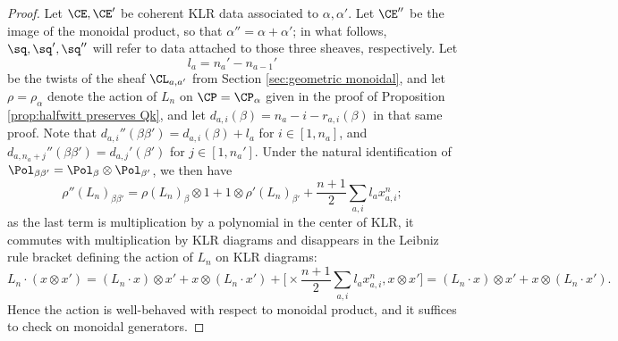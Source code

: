 \documentclass[11pt,reqno]{amsart}
\begin{document}
\begin{proof}
    Let $\CE,\CE'$ be coherent KLR data associated to $\alpha,\alpha'$. Let $\CE''$ be the image of the monoidal product, so that $\alpha''=\alpha+\alpha'$; in what follows, $\sq,\sq',\sq''$ will refer to data attached to those three sheaves, respectively. Let
    \[l_a=n_a'-n_{a-1}'\]
    be the twists of the sheaf $\CL_{a,a'}$ from Section \ref{sec:geometric monoidal}, and let $\rho=\rho_\alpha$ denote the action of $L_n$ on $\CP=\CP_\alpha$ given in the proof of Proposition \ref{prop:halfwitt preserves Qk}, and let $d_{a,i}(\beta)=n_a-i-r_{a,i}(\beta)$ in that same proof. Note that $d_{a,i}''(\beta\beta')=d_{a,i}(\beta)+l_a$ for $i\in[1,n_a]$, and $d_{a,n_a+j}''(\beta\beta')=d_{a,j}'(\beta')$ for $j\in[1,n_a']$. Under the natural identification of $\Pol_{\beta\beta'}=\Pol_\beta\otimes\Pol_{\beta'}$, we then have
    \[\rho''(L_n)_{\beta\beta'}=\rho(L_n)_\beta\otimes 1+1\otimes\rho'(L_n)_{\beta'}+\frac{n+1}{2}\sum_{a,i}l_a x_{a,i}^n;\]
    as the last term is multiplication by a polynomial in the center of KLR, it commutes with multiplication by KLR diagrams and disappears in the Leibniz rule bracket defining the action of $L_n$ on KLR diagrams:
    \[L_n\cdot (x\otimes x')=(L_n\cdot x)\otimes x'+x\otimes (L_n\cdot x')+\Big[\times \frac{n+1}{2}\sum_{a,i}l_a x_{a,i}^n,x\otimes x'\Big]=(L_n\cdot x)\otimes x'+x\otimes (L_n\cdot x').\]
    Hence the action is well-behaved with respect to monoidal product, and it suffices to check on monoidal generators.



\end{proof}
\end{document}
